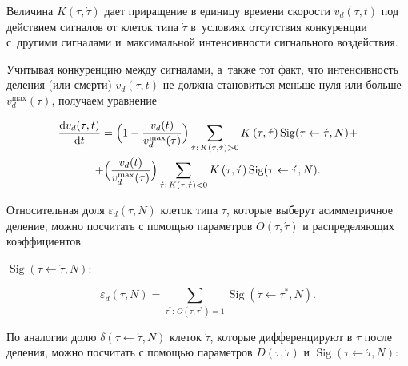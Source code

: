 Величина $K\left( \tau, \acute{\tau}\right)$ дает приращение в единицу времени скорости $v_{d}(\tau,t)$ под действием сигналов от клеток типа $\acute{\tau}$ в~условиях отсутствия конкуренции с~другими сигналами и~максимальной интенсивности сигнального воздействия. 

Учитывая конкуренцию между сигналами, а~также тот факт, что интенсивность деления (или смерти) $v_d(\tau,t)$ не должна становиться меньше  нуля или больше $v_{d}^{\max}(\tau)$, получаем  уравнение

\begin{multline} %

\label{nazarov:coarse:delta_eq13}

  \dfrac{\mathrm{d}v_d(\tau,t)}{\mathrm{d}t} = 

\Bigl( 1 - \dfrac{v_{d}(t)}{v_{d}^{\max}(\tau)}   \Bigr) 

\sum_{\acute{\tau}: \, K(\tau,\acute{\tau})>0} K\left( \tau, \acute{\tau}\right) 

\operatorname{Sig}(\tau \leftarrow \acute{\tau},N) + \\

+

		\Bigl( \dfrac{v_{d}(t)}{v_{d}^{\max}(\tau)}   \Bigr)      

		 \sum_{\acute{\tau}: \, K(\tau,\acute{\tau})<0} K\left( \tau, \acute{\tau}\right) 		 				 \operatorname{Sig}(\tau \leftarrow \acute{\tau},N) .

\end{multline}

%

Относительная доля $\varepsilon_{d}(\tau,N)$ клеток типа $\tau$, которые выберут асимметричное деление, можно посчитать с помощью параметров $O(\tau,\acute{\tau})$ и распределяющих коэффициентов 

$\operatorname{Sig}(\tau \leftarrow \acute{\tau},N)$:

%

\begin{equation} %

\label{nazarov:coarse:delta_eq13}

\varepsilon_{d}(\tau,N) = \sum_{\tau^{*}: \, O(\acute{\tau},\tau^{*})=1}  

\operatorname{Sig}(\acute{\tau} \leftarrow \tau^{*},N).

\end{equation}

%

По аналогии долю $\delta(\tau\leftarrow\acute{\tau},N)$ клеток $\acute{\tau}$, которые дифференцируют в $\tau$ после деления, можно посчитать с помощью параметров $D(\tau,\acute{\tau})$ и $\operatorname{Sig}(\tau \leftarrow \acute{\tau},N)$:

